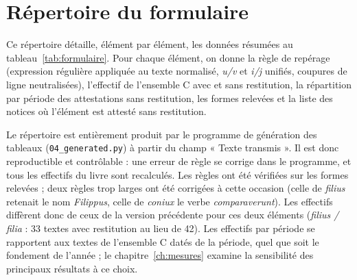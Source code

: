 \chapter{Répertoire du formulaire}\label{ch:rep_formulaire}

Ce répertoire détaille, élément par élément, les données résumées au tableau~\ref{tab:formulaire}. Pour chaque élément, on donne la règle de repérage (expression régulière appliquée au texte normalisé, \emph{u/v} et \emph{i/j} unifiés, coupures de ligne neutralisées), l’effectif de l’ensemble C avec et sans restitution, la répartition par période des attestations sans restitution, les formes relevées et la liste des notices où l’élément est attesté sans restitution.

Le répertoire est entièrement produit par le programme de génération des tableaux (\texttt{04\_generated.py}) à partir du champ « Texte transmis ». Il est donc reproductible et contrôlable : une erreur de règle se corrige dans le programme, et tous les effectifs du livre sont recalculés. Les règles ont été vérifiées sur les formes relevées ; deux règles trop larges ont été corrigées à cette occasion (celle de \emph{filius} retenait le nom \emph{Filippus}, celle de \emph{coniux} le verbe \emph{comparaverunt}). Les effectifs diffèrent donc de ceux de la version précédente pour ces deux éléments (\emph{filius / filia} : 33 textes avec restitution au lieu de 42). Les effectifs par période se rapportent aux textes de l’ensemble C datés de la période, quel que soit le fondement de l’année ; le chapitre~\ref{ch:mesures} examine la sensibilité des principaux résultats à ce choix.

{\small

}
